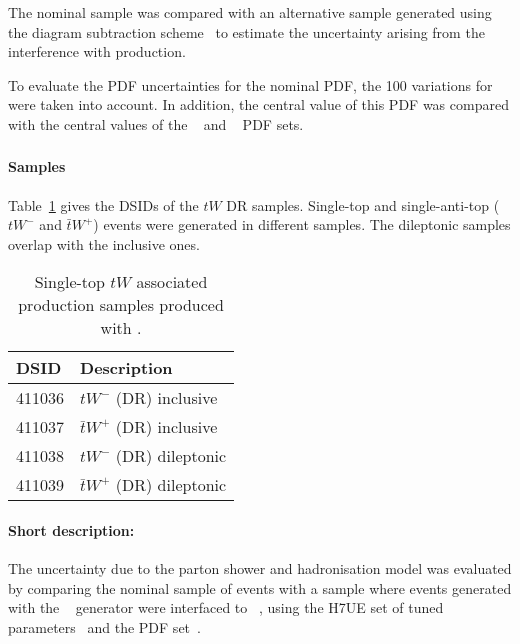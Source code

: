 

The nominal \POWPY[8] sample was compared with an alternative
sample generated using the diagram subtraction
scheme~\cite{Frixione:2008yi,ATL-PHYS-PUB-2016-020} to estimate the
uncertainty arising from the interference with \ttbar production.

To evaluate the PDF uncertainties for the nominal PDF, the 100
variations for \NNPDF[3.0nlo] were taken into account. 
In addition, the central value of this PDF was compared with the 
central values of the \CT[14nnlo]~\cite{Dulat:2015mca} and
\MMHT[nnlo]~\cite{Harland-Lang:2014zoa} PDF sets.


\subsubsection[Powheg+Herwig7]{\POWHER[7]}
\label{subsubsec:tW_PH7}

\paragraph{Samples}

Table~\ref{tab:tW_PH7} gives the DSIDs of the $tW$ \POWHER[7] DR samples.
Single-top and single-anti-top ($tW^-$ and $\bar{t}W^+$) events were generated in different samples.
The dileptonic samples overlap with the inclusive ones.

\begin{table}[htbp]
  \caption{Single-top $tW$ associated production samples produced with \POWHER[7].}%
  \label{tab:tW_PH7}
  \centering
  \begin{tabular}{l l}
    \toprule
    DSID & Description \\
    \midrule
    411036 & $tW^-$ (DR) inclusive \\
    411037 & $\bar{t}W^+$ (DR) inclusive \\
    411038 & $tW^-$ (DR) dileptonic \\
    411039 & $\bar{t}W^+$ (DR) dileptonic \\
    \bottomrule
  \end{tabular}
\end{table}

\paragraph{Short description:}

The uncertainty due to the parton shower and hadronisation model was
evaluated by comparing the nominal sample of events with a sample where
events generated with the
\POWHEGBOX[v2]~\cite{Re:2010bp,Nason:2004rx,Frixione:2007vw,Alioli:2010xd}
generator were interfaced to
\HERWIG[7.04]~\cite{Bahr:2008pv,Bellm:2015jjp}, using the H7UE set
of tuned parameters~\cite{Bellm:2015jjp} and the \MMHT[lo] PDF set~\cite{Harland-Lang:2014zoa}.


